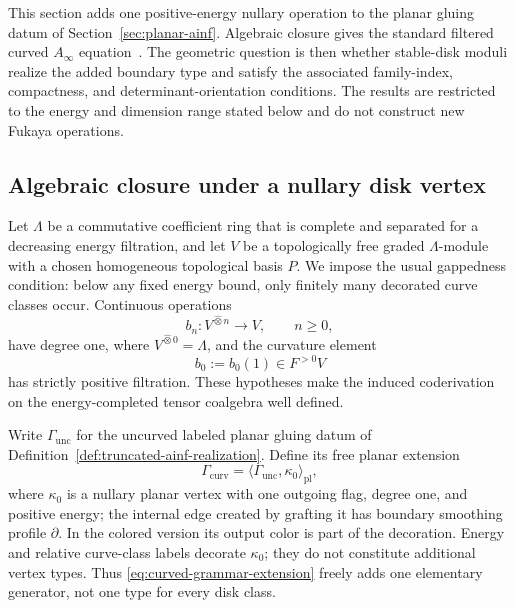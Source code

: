 \documentclass[11pt,letterpaper,twoside]{article}
\theoremstyle{plain}
\theoremstyle{definition}
\theoremstyle{remark}
\let\cite\citep
\newcommand{\Ainf}{A_\infty}
\begin{document}
This section adds one positive-energy nullary operation to the planar gluing datum of Section~\ref{sec:planar-ainf}.  Algebraic closure gives the standard filtered curved \(\Ainf\) equation~\cite{fooo2009}.  The geometric question is then whether stable-disk moduli realize the added boundary type and satisfy the associated family-index, compactness, and determinant-orientation conditions.  The results are restricted to the energy and dimension range stated below and do not construct new Fukaya operations.

\subsection{Algebraic closure under a nullary disk vertex}\label{sec:curved-formal}

Let \(\Lambda\) be a commutative coefficient ring that is complete and separated for a decreasing energy filtration, and let \(V\) be a topologically free graded \(\Lambda\)-module with a chosen homogeneous topological basis \(P\).  We impose the usual gappedness condition: below any fixed energy bound, only finitely many decorated curve classes occur.  Continuous operations
\[
 b_n:V^{\widehat\otimes n}\longrightarrow V,
 \qquad n\geq0,
\]
have degree one, where \(V^{\widehat\otimes0}=\Lambda\), and the curvature element
\[
 b_0:=b_0(1)\in F^{>0}V
\]
has strictly positive filtration.  These hypotheses make the induced coderivation on the energy-completed tensor coalgebra well defined.

Write \(\Gamma_{\mathrm{unc}}\) for the uncurved labeled planar gluing datum of Definition~\ref{def:truncated-ainf-realization}.  Define its free planar extension
\begin{equation}\label{eq:curved-grammar-extension}
 \Gamma_{\mathrm{curv}}
 =\bigl\langle\Gamma_{\mathrm{unc}},\kappa_0\bigr\rangle_{\mathrm{pl}},
\end{equation}
where \(\kappa_0\) is a nullary planar vertex with one outgoing flag, degree one, and positive energy; the internal edge created by grafting it has boundary smoothing profile \(\partial\).  In the colored version its output color is part of the decoration.  Energy and relative curve-class labels decorate \(\kappa_0\); they do not constitute additional vertex types.  Thus \eqref{eq:curved-grammar-extension} freely adds one elementary generator, not one type for every disk class.
\end{document}

